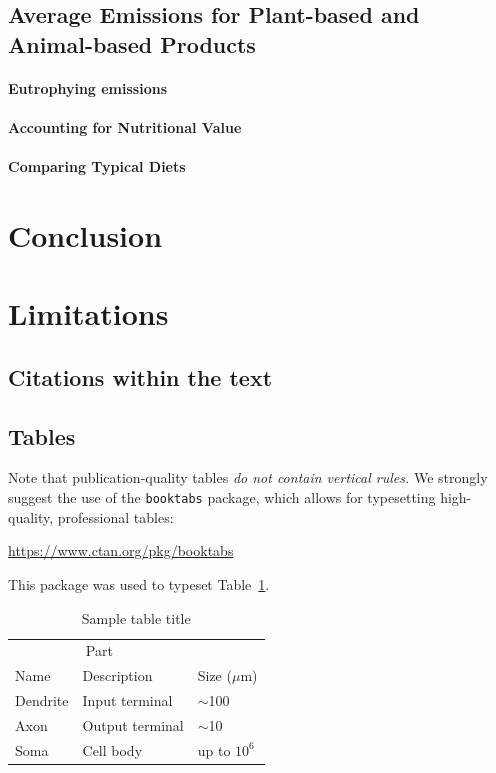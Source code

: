 \documentclass{article}
\begin{document}
\subsection{Average Emissions for Plant-based and Animal-based Products}
\paragraph{Eutrophying emissions}
\paragraph{Accounting  for Nutritional Value}
\paragraph{Comparing Typical Diets}

\section{Conclusion}
\label{conclusion}


\section{Limitations}
\label{limitations}

\subsection{Citations within the text}


\subsection{Tables}



Note that publication-quality tables \emph{do not contain vertical rules.} We
strongly suggest the use of the \verb+booktabs+ package, which allows for
typesetting high-quality, professional tables:
\begin{center}
  \url{https://www.ctan.org/pkg/booktabs}
\end{center}
This package was used to typeset Table~\ref{sample-table}.

\begin{table}
  \caption{Sample table title}
  \label{sample-table}
  \centering
  \begin{tabular}{lll}
    \toprule
    \multicolumn{2}{c}{Part}                   \\
    \cmidrule(r){1-2}
    Name     & Description     & Size ($\mu$m) \\
    \midrule
    Dendrite & Input terminal  & $\sim$100     \\
    Axon     & Output terminal & $\sim$10      \\
    Soma     & Cell body       & up to $10^6$  \\
    \bottomrule
  \end{tabular}
\end{table}
\end{document}
